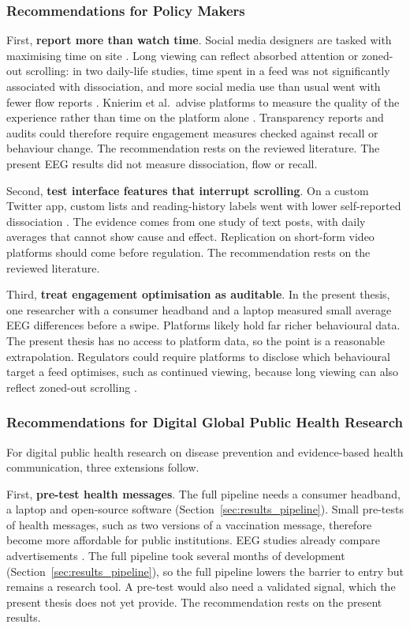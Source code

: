 \documentclass[12pt,a4paper]{report}
\begin{document}
\subsubsection{Recommendations for Policy Makers}

First, \textbf{report more than watch time}. Social media designers are tasked with maximising time on site \cite{baughan_i_2022}. Long viewing can reflect absorbed attention or zoned-out scrolling: in two daily-life studies, time spent in a feed was not significantly associated with dissociation, and more social media use than usual went with fewer flow reports \cite{baughan_i_2022, knierim_flow_2026}. Knierim et al.\ advise platforms to measure the quality of the experience rather than time on the platform alone \cite{knierim_flow_2026}. Transparency reports and audits could therefore require engagement measures checked against recall or behaviour change. The recommendation rests on the reviewed literature. The present EEG results did not measure dissociation, flow or recall.

Second, \textbf{test interface features that interrupt scrolling}. On a custom Twitter app, custom lists and reading-history labels went with lower self-reported dissociation \cite{baughan_i_2022}. The evidence comes from one study of text posts, with daily averages that cannot show cause and effect. Replication on short-form video platforms should come before regulation. The recommendation rests on the reviewed literature.

Third, \textbf{treat engagement optimisation as auditable}. In the present thesis, one researcher with a consumer headband and a laptop measured small average EEG differences before a swipe. Platforms likely hold far richer behavioural data. The present thesis has no access to platform data, so the point is a reasonable extrapolation. Regulators could require platforms to disclose which behavioural target a feed optimises, such as continued viewing, because long viewing can also reflect zoned-out scrolling \cite{baughan_i_2022}.

\subsubsection{Recommendations for Digital Global Public Health Research}

For digital public health research on disease prevention and evidence-based health communication, three extensions follow.

First, \textbf{pre-test health messages}. The full pipeline needs a consumer headband, a laptop and open-source software (Section~\ref{sec:results_pipeline}). Small pre-tests of health messages, such as two versions of a vaccination message, therefore become more affordable for public institutions. EEG studies already compare advertisements \cite{zhang_how_2025-1}. The full pipeline took several months of development (Section~\ref{sec:results_pipeline}), so the full pipeline lowers the barrier to entry but remains a research tool. A pre-test would also need a validated signal, which the present thesis does not yet provide. The recommendation rests on the present results.
\end{document}
